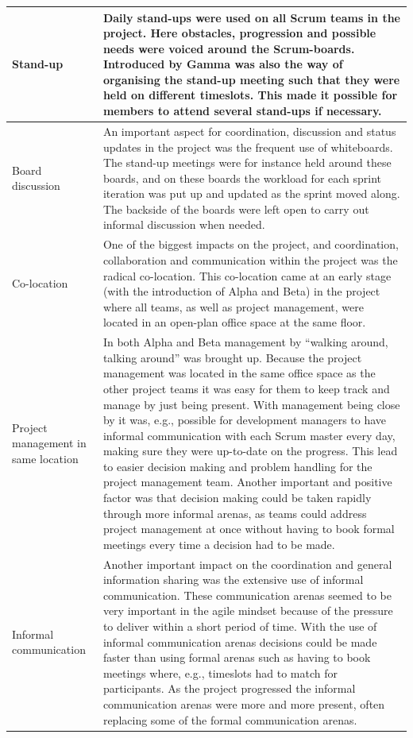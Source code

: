 \begin{center}
\begin{longtable}{| p{6cm} | p{9cm} |}
    Stand-up & Daily stand-ups were used on all Scrum teams in the project. Here obstacles, progression and possible needs were voiced around the Scrum-boards. Introduced by Gamma was also the way of organising the stand-up meeting such that they were held on different timeslots. This made it possible for members to attend several stand-ups if necessary. \\ \hline
    Board discussion & An important aspect for coordination, discussion and status updates in the project was the frequent use of whiteboards. The stand-up meetings were for instance held around these boards, and on these boards the workload for each sprint iteration was put up and updated as the sprint moved along. The backside of the boards were left open to carry out informal discussion when needed. \\ \hline
    Co-location & One of the biggest impacts on the project, and coordination, collaboration and communication within the project was the radical co-location. This co-location came at an early stage (with the introduction of Alpha and Beta) in the project where all teams, as well as project management, were located in an open-plan office space at the same floor. \\ \hline
    Project management in same location & In both Alpha and Beta management by ``walking around, talking around'' was brought up. Because the project management was located in the same office space as the other project teams it was easy for them to keep track and manage by just being present. With management being close by it was, e.g., possible for development managers to have informal communication with each Scrum master every day, making sure they were up-to-date on the progress. This lead to easier decision making and problem handling for the project management team. Another important and positive factor was that decision making could be taken rapidly through more informal arenas, as teams could address project management at once without having to book formal meetings every time a decision had to be made. \\ \hline
    Informal communication & Another important impact on the coordination and general information sharing was the extensive use of informal communication. These communication arenas seemed to be very important in the agile mindset because of the pressure to deliver within a short period of time. With the use of informal communication arenas decisions could be made faster than using formal arenas such as having to book meetings where, e.g., timeslots had to match for participants. As the project progressed the informal communication arenas were more and more present, often replacing some of the formal communication arenas. \\ \hline

\end{longtable}
\end{center}
